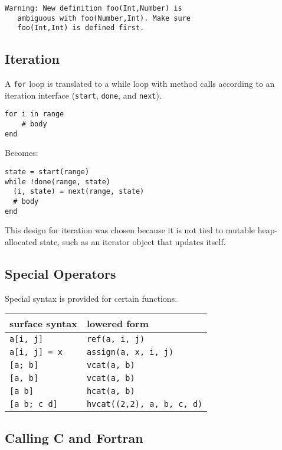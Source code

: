 \documentclass[9pt]{sigplanconf}
\begin{document}
\begin{verbatim}
Warning: New definition foo(Int,Number) is
   ambiguous with foo(Number,Int). Make sure
   foo(Int,Int) is defined first.
\end{verbatim}


\subsection{Iteration}

A {\tt for} loop is translated to a while loop with method calls according
to an iteration interface ({\tt start}, {\tt done}, and {\tt next}).

\begin{verbatim}
for i in range
    # body
end
\end{verbatim}

Becomes:

\begin{verbatim}
state = start(range)
while !done(range, state)
  (i, state) = next(range, state)
  # body
end
\end{verbatim}

This design for iteration was chosen because it is not tied to mutable
heap-allocated state, such as an iterator object that updates itself.

\subsection{Special Operators}

Special syntax is provided for certain functions.

\begin{tabular}{|l|l|}\hline
surface syntax     & lowered form \\\hline \hline
{\tt a[i, j]}      & {\tt ref(a, i, j)} \\\hline
{\tt a[i, j] = x}  & {\tt assign(a, x, i, j)} \\\hline
{\tt [a; b]}       & {\tt vcat(a, b)} \\\hline
{\tt [a, b]}       & {\tt vcat(a, b)} \\\hline
{\tt [a b]}        & {\tt hcat(a, b)} \\\hline
{\tt [a b; c d]}   & {\tt hvcat((2,2), a, b, c, d)}\\\hline
\end{tabular}


\subsection{Calling C and Fortran}
\end{document}
